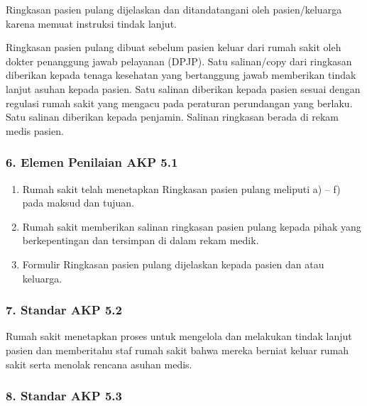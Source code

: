 \documentclass[
]{book}
\providecommand{\tightlist}{%
  \setlength{\itemsep}{0pt}\setlength{\parskip}{0pt}}
\begin{document}
Ringkasan pasien pulang dijelaskan dan ditandatangani oleh pasien/keluarga karena memuat instruksi tindak lanjut.

Ringkasan pasien pulang dibuat sebelum pasien keluar dari rumah sakit oleh dokter penanggung jawab pelayanan (DPJP). Satu salinan/copy dari ringkasan diberikan kepada tenaga kesehatan yang bertanggung jawab memberikan tindak lanjut asuhan kepada pasien. Satu salinan diberikan kepada pasien sesuai dengan regulasi rumah sakit yang mengacu pada peraturan perundangan yang berlaku. Satu salinan diberikan kepada penjamin. Salinan ringkasan berada di rekam medis pasien.

\hypertarget{elemen-penilaian-akp-5.1}{%
\subsubsection*{6. Elemen Penilaian AKP 5.1}\label{elemen-penilaian-akp-5.1}}

\begin{enumerate}
\def\labelenumi{\alph{enumi}.}
\tightlist
\item
  Rumah sakit telah menetapkan Ringkasan pasien pulang meliputi a) -- f) pada maksud dan tujuan.
\item
  Rumah sakit memberikan salinan ringkasan pasien pulang kepada pihak yang berkepentingan dan tersimpan di dalam rekam medik.
\item
  Formulir Ringkasan pasien pulang dijelaskan kepada pasien dan atau keluarga.
\end{enumerate}

\hypertarget{standar-akp-5.2}{%
\subsubsection*{7. Standar AKP 5.2}\label{standar-akp-5.2}}

Rumah sakit menetapkan proses untuk mengelola dan melakukan tindak lanjut pasien dan memberitahu staf rumah sakit bahwa mereka berniat keluar rumah sakit serta menolak rencana asuhan medis.

\hypertarget{standar-akp-5.3}{%
\subsubsection*{8. Standar AKP 5.3}\label{standar-akp-5.3}}
\end{document}
